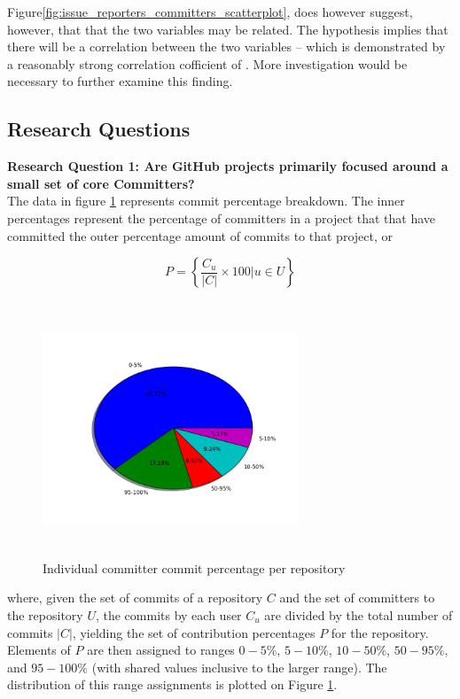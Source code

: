 \documentclass{proc}
\begin{document}
Figure\ref{fig:issue_reporters_committers_scatterplot}, does however suggest, however, that that the two variables may be related. The hypothesis implies that there will be a correlation between the two variables -- which is demonstrated by a reasonably strong correlation cofficient of . More investigation would be necessary to further examine this finding.\\

\subsection{Research Questions}
\textbf{Research Question 1: Are GitHub projects primarily focused around a small set of core Committers?}\\
The data in figure \ref{fig:committers_percentage_pie_chart} represents commit percentage breakdown. The inner percentages represent the percentage of committers in a project that that have committed the outer percentage amount of commits to that project, or

 \[ P = \left\{ \frac{ C_u } { |C| } \times 100 \Big| u \in U \right\} \]

\begin{figure}
\includegraphics[height=3in,width=3in]{images/committers_percentage_pie_chart.png}
\caption{Individual committer commit percentage per repository}
\label{fig:committers_percentage_pie_chart}
\end{figure}

where, given the set of commits of a repository $C$ and the set of committers to the repository $U$, the commits by each user $C_u$ are divided by the total number of commits $|C|$, yielding the set of contribution percentages $P$ for the repository. Elements of $P$ are then assigned to ranges $0-5\%$, $5-10\%$, $10-50\%$, $50-95\%$, and $95-100\%$ (with shared values inclusive to the larger range). The distribution of this range assignments is plotted on Figure \ref{fig:committers_percentage_pie_chart}.
\end{document}
